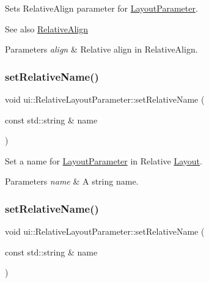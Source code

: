 Sets Relative\+Align parameter for \hyperlink{classui_1_1LayoutParameter}{Layout\+Parameter}.

\begin{DoxySeeAlso}{See also}
\hyperlink{classui_1_1RelativeLayoutParameter_a40283d09524c58e61741de3288e6769d}{Relative\+Align} 
\end{DoxySeeAlso}

\begin{DoxyParams}{Parameters}
{\em align} & Relative align in {\ttfamily Relative\+Align}. \\
\hline
\end{DoxyParams}
\mbox{\label{classui_1_1RelativeLayoutParameter_a08d5be0738e5aa06c95d4ecf20b87b5f}} 
\subsubsection{\texorpdfstring{set\+Relative\+Name()}{setRelativeName()}\hspace{0.1cm}{\footnotesize\ttfamily [1/2]}}
{\footnotesize\ttfamily void ui\+::\+Relative\+Layout\+Parameter\+::set\+Relative\+Name (\begin{DoxyParamCaption}\item[{const std\+::string \&}]{name }\end{DoxyParamCaption})}

Set a name for \hyperlink{classui_1_1LayoutParameter}{Layout\+Parameter} in Relative \hyperlink{classui_1_1Layout}{Layout}.


\begin{DoxyParams}{Parameters}
{\em name} & A string name. \\
\hline
\end{DoxyParams}
\mbox{\label{classui_1_1RelativeLayoutParameter_a08d5be0738e5aa06c95d4ecf20b87b5f}} 
\subsubsection{\texorpdfstring{set\+Relative\+Name()}{setRelativeName()}\hspace{0.1cm}{\footnotesize\ttfamily [2/2]}}
{\footnotesize\ttfamily void ui\+::\+Relative\+Layout\+Parameter\+::set\+Relative\+Name (\begin{DoxyParamCaption}\item[{const std\+::string \&}]{name }\end{DoxyParamCaption})}


